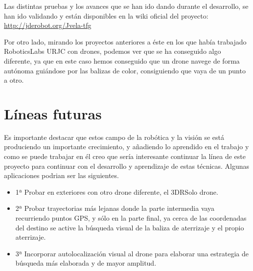 \hspace{1cm} Las distintas pruebas y los avances que se han ido dando durante el desarrollo, se han ido validando y est\'an disponibles en la wiki oficial del proyecto:\\
\underline{\url{http://jderobot.org/Jvela-tfg}}

\hspace{1cm} Por otro lado, mirando los proyectos anteriores a \'este en los que hab\'ia trabajado RoboticsLabs URJC con drones, podemos ver que se ha conseguido algo diferente, ya que en este caso hemos conseguido que un drone navege de forma aut\'onoma gui\'andose por las balizas de color, consiguiendo que vaya de un punto a otro. 


\section{L\'ineas futuras}

\hspace{1cm}Es importante destacar que estos campo de la rob\'otica y la visi\'on se est\'a produciendo un importante crecimiento, y añadiendo lo aprendido en el trabajo y como se puede trabajar en \'el creo que ser\'ia interesante continuar la l\'inea de este proyecto para continuar con el desarrollo y aprendizaje de estas t\'ecnicas. Algunas aplicaciones podrian ser las siguientes.

\begin{itemize}
\item 1ª Probar en exteriores con otro drone diferente, el 3DRSolo drone.
\item 2ª Probar trayectorias m\'as lejanas donde la parte intermedia vaya recurriendo puntos GPS, y s\'olo en la parte final, ya cerca de las coordenadas del destino se active la b\'usqueda visual de la baliza de aterrizaje y el propio aterrizaje.
\item 3ª Incorporar autolocalizaci\'on visual al drone para elaborar una estrategia de b\'usqueda m\'as elaborada y de mayor amplitud.
\end{itemize}


